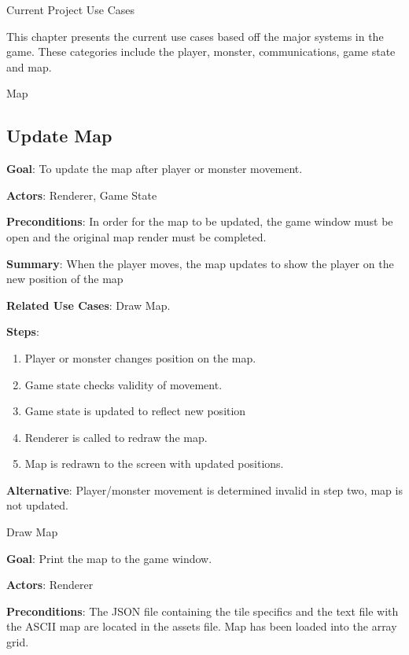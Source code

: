 \documentclass[12pt]{report}
\begin{document}
%
%

\begin{chapter}{Current Project Use Cases}

This chapter presents the current use cases based off the major systems in the game. These categories
include the player, monster, communications, game state and map.

  \begin{section}{Map}
    \subsection{Update Map}
      \textbf{Goal}: To update the map after player or monster movement.

      \textbf{Actors}:
      Renderer, Game State

      \textbf{Preconditions}: In order for the map to be updated, the game window must
      be open and the original map render must be completed.

      \textbf{Summary}: 
      When the player moves, the map updates to show the player on the new position of the map
      

      \textbf{Related Use Cases}: Draw Map.
	
      \textbf{Steps}: 
      \begin{enumerate}
	 \item Player or monster changes position on the map.
	 \item Game state checks validity of movement.
	 \item Game state is updated to reflect new position
      	 \item Renderer is called to redraw the map.
	 \item Map is redrawn to the screen with updated positions.
      \end{enumerate}
	
      \textbf{Alternative}: 
      Player/monster movement is determined invalid in step two, map is not updated.

    \begin{subsection}{Draw Map}

      \textbf{Goal}: 
      Print the map to the game window.

      \textbf{Actors}: 
      Renderer

      \textbf{Preconditions}: 
      The JSON file containing the tile specifics and the text file with the ASCII map are located in the assets file. Map has been loaded into the array grid.


\end{subsection}
\end{section}
\end{chapter}
\end{document}
